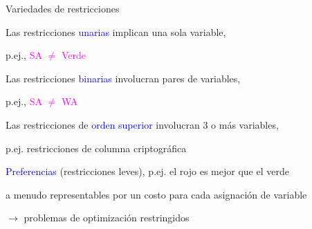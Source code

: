 \begin{frame}{Variedades de restricciones}
    
    Las restricciones \textcolor{blue}{unarias} implican una sola variable,
    
    \quad p.ej., \textcolor{magenta}{SA $\neq$ Verde} 
    \bigskip
    
    Las restricciones \textcolor{blue}{binarias} involucran pares de variables,
    
    \quad p.ej., \textcolor{magenta}{SA $\neq$ WA} 
    \bigskip
    
    
    Las restricciones de \textcolor{blue}{orden superior} involucran 3 o más variables,
    
    p.ej. restricciones de columna criptográfica
    \bigskip
    
    
    \textcolor{blue}{Preferencias} (restricciones leves), p.ej. el rojo es mejor que el verde
    
    
    a menudo representables por un costo para cada asignación de variable

    \quad $\rightarrow$ problemas de optimización restringidos
    
    
\end{frame}